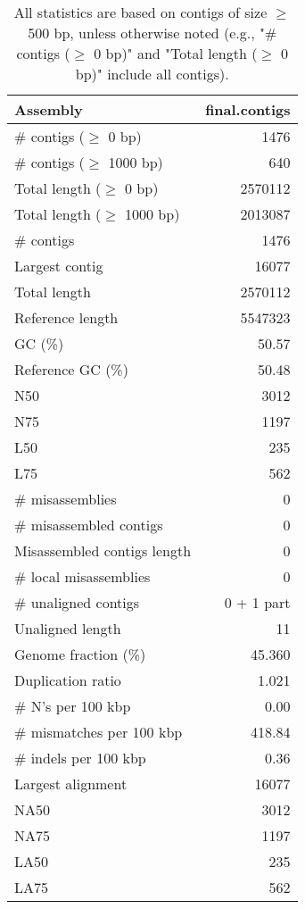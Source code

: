 \documentclass[12pt,a4paper]{article}
\begin{document}
\begin{table}[ht]
\begin{center}
\caption{All statistics are based on contigs of size $\geq$ 500 bp, unless otherwise noted (e.g., "\# contigs ($\geq$ 0 bp)" and "Total length ($\geq$ 0 bp)" include all contigs).}
\begin{tabular}{|l*{1}{|r}|}
\hline
Assembly & final.contigs \\ \hline
\# contigs ($\geq$ 0 bp) & 1476 \\ \hline
\# contigs ($\geq$ 1000 bp) & 640 \\ \hline
Total length ($\geq$ 0 bp) & 2570112 \\ \hline
Total length ($\geq$ 1000 bp) & 2013087 \\ \hline
\# contigs & 1476 \\ \hline
Largest contig & 16077 \\ \hline
Total length & 2570112 \\ \hline
Reference length & 5547323 \\ \hline
GC (\%) & 50.57 \\ \hline
Reference GC (\%) & 50.48 \\ \hline
N50 & 3012 \\ \hline
N75 & 1197 \\ \hline
L50 & 235 \\ \hline
L75 & 562 \\ \hline
\# misassemblies & 0 \\ \hline
\# misassembled contigs & 0 \\ \hline
Misassembled contigs length & 0 \\ \hline
\# local misassemblies & 0 \\ \hline
\# unaligned contigs & 0 + 1 part \\ \hline
Unaligned length & 11 \\ \hline
Genome fraction (\%) & 45.360 \\ \hline
Duplication ratio & 1.021 \\ \hline
\# N's per 100 kbp & 0.00 \\ \hline
\# mismatches per 100 kbp & 418.84 \\ \hline
\# indels per 100 kbp & 0.36 \\ \hline
Largest alignment & 16077 \\ \hline
NA50 & 3012 \\ \hline
NA75 & 1197 \\ \hline
LA50 & 235 \\ \hline
LA75 & 562 \\ \hline
\end{tabular}
\end{center}
\end{table}
\end{document}
